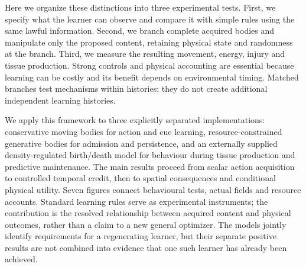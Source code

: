 Here we organize these distinctions into three experimental tests. First, we specify what the learner can observe and compare it with simple rules using the same lawful information. Second, we branch complete acquired bodies and manipulate only the proposed content, retaining physical state and randomness at the branch. Third, we measure the resulting movement, energy, injury and tissue production. Strong controls and physical accounting are essential because learning can be costly and its benefit depends on environmental timing\cite{mery2005,dunlap2009,mitchell,tagkopoulos}. Matched branches test mechanisms within histories; they do not create additional independent learning histories.

We apply this framework to three explicitly separated implementations: conservative moving bodies for action and cue learning, resource-constrained generative bodies for admission and persistence, and an externally supplied density-regulated birth/death model for behaviour during tissue production and predictive maintenance. The main results proceed from scalar action acquisition to controlled temporal credit, then to spatial consequences and conditional physical utility. Seven figures connect behavioural tests, actual fields and resource accounts. Standard learning rules serve as experimental instruments; the contribution is the resolved relationship between acquired content and physical outcomes, rather than a claim to a new general optimizer. The models jointly identify requirements for a regenerating learner, but their separate positive results are not combined into evidence that one such learner has already been achieved.
